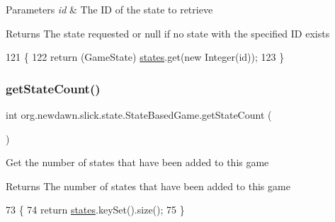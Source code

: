 \begin{DoxyParams}{Parameters}
{\em id} & The ID of the state to retrieve \\
\hline
\end{DoxyParams}
\begin{DoxyReturn}{Returns}
The state requested or null if no state with the specified ID exists 
\end{DoxyReturn}

\begin{DoxyCode}
121                                       \{
122         \textcolor{keywordflow}{return} (GameState) \mbox{\hyperlink{namespacestates}{states}}.get(\textcolor{keyword}{new} Integer(\textcolor{keywordtype}{id}));
123     \}
\end{DoxyCode}
\mbox{\label{classorg_1_1newdawn_1_1slick_1_1state_1_1_state_based_game_ab10064d261142bde013a71cac89bcbca}} 
\subsubsection{\texorpdfstring{get\+State\+Count()}{getStateCount()}}
{\footnotesize\ttfamily int org.\+newdawn.\+slick.\+state.\+State\+Based\+Game.\+get\+State\+Count (\begin{DoxyParamCaption}{ }\end{DoxyParamCaption})\hspace{0.3cm}{\ttfamily [inline]}}

Get the number of states that have been added to this game

\begin{DoxyReturn}{Returns}
The number of states that have been added to this game 
\end{DoxyReturn}

\begin{DoxyCode}
73                                \{
74         \textcolor{keywordflow}{return} \mbox{\hyperlink{namespacestates}{states}}.keySet().size();
75     \}
\end{DoxyCode}
\mbox{\label{classorg_1_1newdawn_1_1slick_1_1state_1_1_state_based_game_a03a2277e7ca503ffd922b68b497f8d5b}} 
